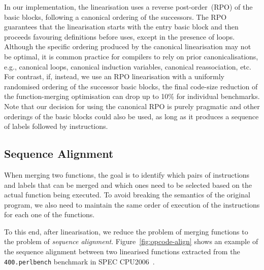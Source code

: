 In our implementation, the linearisation uses a reverse post-order~(RPO) of the
basic blocks, following a canonical ordering of the successors.
The RPO guarantees that the linearisation starts with the entry basic block and
then proceeds favouring definitions before uses, except in the presence of loops.
Although the specific ordering produced by the canonical linearisation may not
be optimal, it is common practice for compilers to rely on prior
canonicalisations, e.g., 
canonical loops, canonical induction variables, canonical reassociation, etc.
For contrast, if, instead, we use an RPO linearisation with a uniformly
randomised ordering of the successor basic blocks, the final code-size reduction
of the function-merging optimisation can drop up to 10\% for individual
benchmarks.
Note that our decision for using the canonical RPO is purely pragmatic and
other orderings of the basic blocks could also be used, as long as it produces
a sequence of labels followed by instructions.


\subsection{Sequence Alignment}

When merging two functions, the goal is to identify which pairs of instructions and labels that can be merged and which ones need to be selected based on the actual function being executed.
To avoid breaking the semantics of the original program, we also need to maintain the same order of execution of the instructions for each one of the functions.

To this end, after linearisation, we reduce the problem of merging functions to the problem of \textit{sequence alignment}.
Figure~\ref{fig:opcode-align} shows an example of the sequence alignment between two linearised functions extracted from the \texttt{400.perlbench} benchmark in SPEC CPU2006~\cite{spec}.

